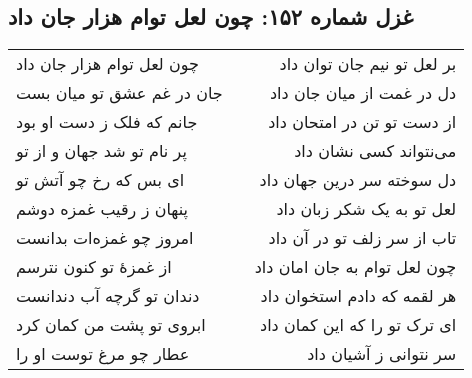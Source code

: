 \begin{center}
\section*{غزل شماره ۱۵۲: چون لعل توام هزار جان داد}
\label{sec:152}
\begin{longtable}{l p{0.5cm} r}
چون لعل توام هزار جان داد
&&
بر لعل تو نیم جان توان داد
\\
جان در غم عشق تو میان بست
&&
دل در غمت از میان جان داد
\\
جانم که فلک ز دست او بود
&&
از دست تو تن در امتحان داد
\\
پر نام تو شد جهان و از تو
&&
می‌نتواند کسی نشان داد
\\
ای بس که رخ چو آتش تو
&&
دل سوخته سر درین جهان داد
\\
پنهان ز رقیب غمزه دوشم
&&
لعل تو به یک شکر زبان داد
\\
امروز چو غمزه‌ات بدانست
&&
تاب از سر زلف تو در آن داد
\\
از غمزهٔ تو کنون نترسم
&&
چون لعل توام به جان امان داد
\\
دندان تو گرچه آب دندانست
&&
هر لقمه که دادم استخوان داد
\\
ابروی تو پشت من کمان کرد
&&
ای ترک تو را که این کمان داد
\\
عطار چو مرغ توست او را
&&
سر نتوانی ز آشیان داد
\\
\end{longtable}
\end{center}
